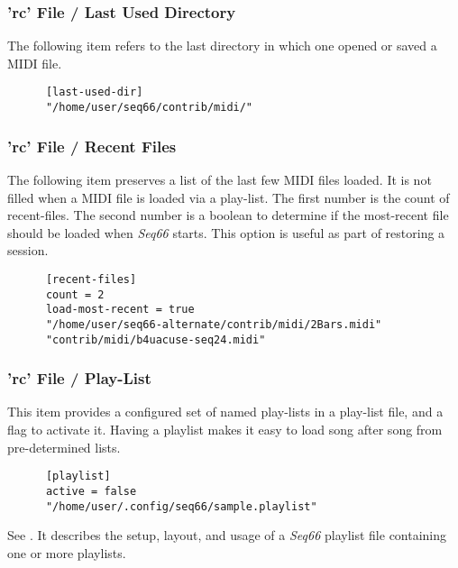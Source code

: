 \subsubsection{'rc' File / Last Used Directory}
\label{subsubsec:configuration_rc_last_used_dir}

   The following item refers to the last directory in which one opened or
   saved a MIDI file.

   \begin{verbatim}
      [last-used-dir]
      "/home/user/seq66/contrib/midi/"
   \end{verbatim}

\subsubsection{'rc' File / Recent Files}
\label{subsubsec:configuration_rc_recent_files}

   The following item preserves a list of the last few MIDI files loaded.
   It is not filled when a MIDI file is loaded via a play-list.
   The first number is the count of recent-files.
   The second number is a boolean to determine if the most-recent file
   should be loaded when \textsl{Seq66} starts.
   This option is useful as part of restoring a session.

   \begin{verbatim}
      [recent-files]
      count = 2
      load-most-recent = true
      "/home/user/seq66-alternate/contrib/midi/2Bars.midi"
      "contrib/midi/b4uacuse-seq24.midi"
   \end{verbatim}

\subsubsection{'rc' File / Play-List}
\label{subsubsec:configuration_rc_playlist}

   This item provides a configured set of named play-lists in a play-list file,
   and a flag to activate it.
   Having a playlist makes it easy to load song after song from pre-determined
   lists.
   
   \index{[playlist]}
   \begin{verbatim}
      [playlist]
      active = false
      "/home/user/.config/seq66/sample.playlist"
   \end{verbatim}

   See .
   It describes the setup, layout, and usage of a
   \textsl{Seq66} playlist file containing one or more playlists.

